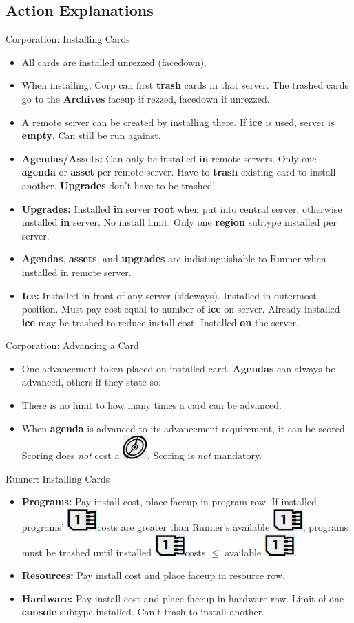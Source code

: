 \documentclass[12pt]{article}
\newenvironment{itemizeCustom}
{\begin{itemize}
  \setlength{\itemsep}{1pt}
  \setlength{\parskip}{0pt}
  \setlength{\parsep}{0pt}}
{\end{itemize}}
\newcommand{\action}{\includegraphics[scale=0.40]{images/actionLarge.jpg}\hspace{0.3em}}
\newcommand{\memoryUnit}{\includegraphics[scale=0.40]{images/memoryUnitLarge.jpg}\hspace{0.3em}}
\newcommand{\memoryUnitNoSpace}{\includegraphics[scale=0.40]{images/memoryUnitLarge.jpg}}
\begin{document}
\begin{multicols*}{2}
\section*{Action Explanations}
Corporation: Installing Cards
\begin{itemizeCustom}
	\item All cards are installed unrezzed (facedown).
	\item When installing, Corp can first \textbf{trash} cards in that server. The trashed cards go to the \textbf{Archives} faceup if rezzed, facedown if unrezzed.
	\item A remote server can be created by installing there. If \textbf{ice} is used, server is \textbf{empty}. Can still be run against.
	\item \textbf{Agendas/Assets:} Can only be installed \textbf{in} remote servers. Only one \textbf{agenda} or \textbf{asset} per remote server. Have to \textbf{trash} existing card to install another. \textbf{Upgrades} don't have to be trashed!
	\item \textbf{Upgrades:} Installed \textbf{in} server \textbf{root} when put into central server, otherwise installed \textbf{in} server. No install limit. Only one \textbf{region} subtype installed per server.
	\item \textbf{Agendas}, \textbf{assets}, and \textbf{upgrades} are indistinguishable to Runner when installed in remote server.
	\item \textbf{Ice:} Installed in front of any server (sideways). Installed in outermost position. Must pay cost equal to number of \textbf{ice} on server. Already installed \textbf{ice} may be trashed to reduce install cost. Installed \textbf{on} the server.
\end{itemizeCustom}

Corporation: Advancing a Card
\begin{itemizeCustom}
	\item One advancement token placed on installed card. \textbf{Agendas} can always be advanced, others if they state so.
	\item There is no limit to how many times a card can be advanced. 
	\item When \textbf{agenda} is advanced to its advancement requirement, it can be scored. Scoring does \emph{not} cost a \action. Scoring is \emph{not} mandatory.
\end{itemizeCustom}

Runner: Installing Cards
\begin{itemizeCustom}
	\item \textbf{Programs:} Pay install cost, place faceup in program row. If installed programs' \memoryUnit costs are greater than Runner's available \memoryUnitNoSpace, programs must be trashed until installed \memoryUnit costs $\le$ available \memoryUnitNoSpace.
	\item \textbf{Resources:} Pay install cost and place faceup in resource row.
	\item \textbf{Hardware:} Pay install cost and place faceup in hardware row. Limit of one \textbf{console} subtype installed. Can't trash to install another.
\end{itemizeCustom}


\end{multicols*}
\end{document}
